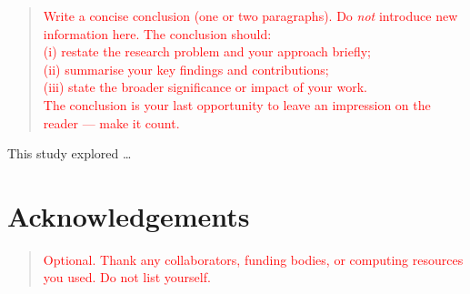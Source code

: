 \documentclass[journal, 10pt, twoside]{IEEEtran}
\begin{document}
\begin{quote}
  \textcolor{red}{%
    Write a concise conclusion (one or two paragraphs).  Do \emph{not} introduce new information here.  The conclusion should:\\ 
    (i) restate the research problem and your approach briefly;\\
    (ii) summarise your key findings and contributions;\\
    (iii) state the broader significance or impact of your work.\\[4pt]
    The conclusion is your last opportunity to leave an impression on the reader --- make it count.%
  }
\end{quote}

This study explored \dots %

\section*{Acknowledgements}
\begin{quote}
  \textcolor{red}{%
    Optional.  Thank any collaborators, funding bodies, or computing resources you used.  Do not list yourself.%
  }
\end{quote}

\balance  %

\end{document}
